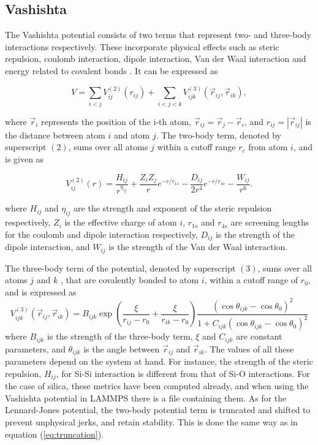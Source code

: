 \documentclass[twoside,english]{uiofysmaster}
\newcommand\lr[1]{\left(#1\right)}
\begin{document}
\subsection{Vashishta}
The Vashishta potential consists of two terms that represent two- and three-body interactions respectively. These incorporate physical effects such as steric repulsion, coulomb interaction, dipole interaction, Van der Waal interaction and energy related to covalent bonds \cite{Vashishta1990}. It can be expressed as

\begin{equation}
V = \sum_{i<j} V_{ij}^{(2)}(r_{ij}) + \sum_{i<j<k} V_{ijk}^{(3)}(\vec{r}_{ij}, \vec{r}_{ik}) , \label{vashistaTwoTerm}
\end{equation}

\noindent
where $\vec{r}_i$ represents the position of the i-th atom, $\vec{r}_{ij} = \vec{r}_j - \vec{r}_i$, and $r_{ij} = |\vec{r}_{ij}|$ is the distance between atom $i$ and atom $j$.
The two-body term, denoted by superscript $(2)$, sums over all atoms $j$ within a cutoff range $r_c$ from atom $i$, and is given as

\begin{equation}
	 V_{ij}^{(2)}(r) = 
	 \frac{H_{ij}}{\displaystyle r^{\eta_{ij}}} +
	 \frac{Z_iZ_j}{r}e^{-r/r_{1s}} -
	 \frac{D_{ij}}{2r^4}e^{-r/r_{4s}} - 
	 \frac{W_{ij}}{r^6}.
\end{equation}

\noindent 
where $H_{ij}$ and $\eta_{ij}$ are the strength and exponent of the steric repulsion respectively, $Z_i$ is the effective charge of atom $i$, $r_{1s}$ and $r_{4s}$ are screening lengths for the coulomb and dipole interaction respectively, $D_{ij}$ is the strength of the dipole interaction, and $W_{ij}$ is the strength of the Van der Waal interaction.

The three-body term of the potential, denoted by superscript $(3)$, sums over all atoms $j$ and $k$ , that are covalently bonded to atom $i$, within a cutoff range of $r_0$, and is expressed as
\begin{equation}
	V_{ijk}^{(3)}(\vec{r}_{ij}, \vec{r}_{ik}) = 
	B_{ijk} \exp\lr{\frac{\xi}{r_{ij}-r_0} + \frac{\xi}{r_{ik}-r_0}}
	\frac{\lr{\cos \theta_{ijk} - \cos \theta_0}^2}{1 + C_{ijk}\lr{\cos \theta_{ijk} - \cos \theta_0}^2}
\end{equation}  
where $B_{ijk}$ is the strength of the three-body term, $\xi$ and $C_{ijk}$ are constant parameters, and $\theta_{ijk}$ is the angle between $\vec{r}_{ij}$ and $\vec{r}_{ik}$.
The values of all these parameters depend on the system at hand. 
For instance, the strength of the steric repulsion, $H_{ij}$, for Si-Si interaction is different from that of Si-O interactions. 
For the case of silica, these metrics have been computed already, and when using the Vashishta potential in LAMMPS there is a file containing them.
As for the Lennard-Jones potential, the two-body potential term is truncated and shifted to prevent unphysical jerks, and retain stability. 
This is done the same way as in equation (\ref{eq:truncation}).
\end{document}
